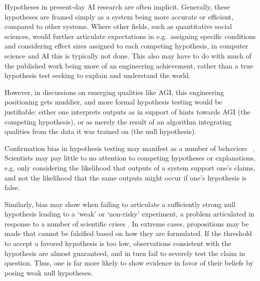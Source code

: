 \documentclass{article}
\theoremstyle{plain}
\theoremstyle{definition}
\theoremstyle{remark}
\begin{document}
Hypotheses in present-day AI research are often implicit. Generally, these hypotheses are framed simply as a system being more accurate or efficient, compared to other systems. Where other fields, such as quantitative social sciences, would further articulate expectations in e.g.\ assigning specific conditions and considering effect sizes assigned to each competing hypothesis, in computer science and AI this is typically not done. This also may have to do with much of the published work being more of an engineering achievement, rather than a true hypothesis test seeking to explain and understand the world. %

However, in discussions on emerging qualities like AGI, this engineering positioning gets muddier, and more formal hypothesis testing would be justifiable: either one interprets outputs as in support of hints towards AGI (the competing hypothesis), or as merely the result of an algorithm integrating qualities from the data it was trained on (the null hypothesis). 

Confirmation bias in hypothesis testing may manifest as a number of behaviors~ \citet{nickerson1998confirmation}. Scientists may pay little to no attention to competing hypotheses or explanations, e.g. only considering the likelihood that outputs of a system support one's claims, and not the likelihood that the same outputs might occur if one's hypothesis is false. 

Similarly, bias may show when failing to articulate a sufficiently strong null hypothesis leading to a `weak' or `non-risky' experiment, a problem articulated in response to a number of scientific crises \cite{claesen2022severity}. In extreme cases, propositions may be made that cannot be falsified based on how they are formulated. If the threshold to accept a favored hypothesis is too low, observations consistent with the hypothesis are almost guaranteed, and in turn fail to severely test the claim in question. Thus, one is far more likely to show evidence in favor of their beliefs by posing weak null hypotheses. 
\end{document}
